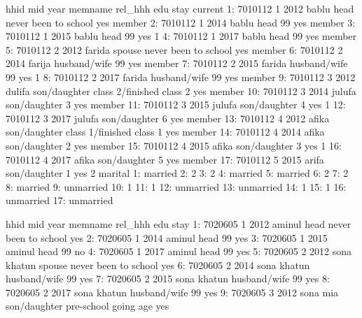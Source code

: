 \begin{Schunk}
\begin{Soutput}
       hhid mid year memname      rel_hhh                      edu stay current
 1: 7010112   1 2012   bablu         head     never been to school  yes  member
 2: 7010112   1 2014   bablu         head                       99  yes  member
 3: 7010112   1 2015   bablu         head                       99  yes       1
 4: 7010112   1 2017   bablu         head                       99  yes  member
 5: 7010112   2 2012  farida       spouse     never been to school  yes  member
 6: 7010112   2 2014  farija husband/wife                       99  yes  member
 7: 7010112   2 2015  farida husband/wife                       99  yes       1
 8: 7010112   2 2017  farida husband/wife                       99  yes  member
 9: 7010112   3 2012  dulifa son/daughter class 2/finished class 2  yes  member
10: 7010112   3 2014  julufa son/daughter                        3  yes  member
11: 7010112   3 2015  julufa son/daughter                        4  yes       1
12: 7010112   3 2017  julufa son/daughter                        6  yes  member
13: 7010112   4 2012   afika son/daughter class 1/finished class 1  yes  member
14: 7010112   4 2014   afika son/daughter                        2  yes  member
15: 7010112   4 2015   afika son/daughter                        3  yes       1
16: 7010112   4 2017   afika son/daughter                        5  yes  member
17: 7010112   5 2015   arifa son/daughter                        1  yes       2
      marital
 1:   married
 2:         2
 3:         2
 4:   married
 5:   married
 6:         2
 7:         2
 8:   married
 9: unmarried
10:         1
11:         1
12: unmarried
13: unmarried
14:         1
15:         1
16: unmarried
17: unmarried
\end{Soutput}
\begin{Soutput}
       hhid mid year     memname      rel_hhh                  edu stay
 1: 7020605   1 2012      aminul         head never been to school  yes
 2: 7020605   1 2014      aminul         head                   99  yes
 3: 7020605   1 2015      aminul         head                   99   no
 4: 7020605   1 2017      aminul         head                   99  yes
 5: 7020605   2 2012 sona khatun       spouse never been to school  yes
 6: 7020605   2 2014 sona khatun husband/wife                   99  yes
 7: 7020605   2 2015 sona khatun husband/wife                   99  yes
 8: 7020605   2 2017 sona khatun husband/wife                   99  yes
 9: 7020605   3 2012    sona mia son/daughter pre-school going age  yes

\end{Soutput}
\end{Schunk}
